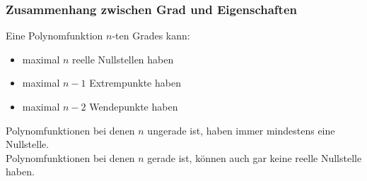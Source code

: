 \subsubsection*{Zusammenhang zwischen Grad und Eigenschaften}
Eine Polynomfunktion $n$-ten Grades kann:
\begin{itemize}
    \item maximal $n$ reelle Nullstellen haben
    \item maximal $n-1$ Extrempunkte haben
    \item maximal $n-2$ Wendepunkte haben
\end{itemize}
Polynomfunktionen bei denen $n$ ungerade ist, haben immer mindestens eine Nullstelle. \\
Polynomfunktionen bei denen $n$ gerade ist, können auch gar keine reelle Nullstelle haben.

